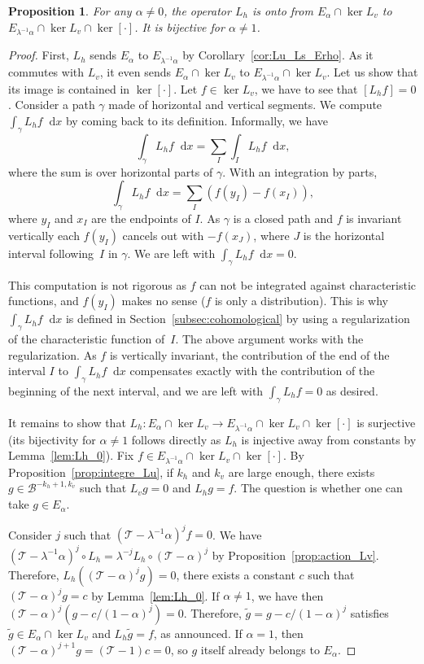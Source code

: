 \documentclass[JEP,XML,SOM,Unicode]{cedram}
\newcommand{\boB}{\mathcal{B}}
\newcommand{\boT}{\mathcal{T}}
\newcommand{\dd}{\mathop{}\!\mathrm{d}}
\newtheorem{prop}[thm]{Proposition}
\theoremstyle{definition}
\numberwithin{equation}{section}
\begin{document}
\begin{prop}
\label{prop:L_h_surj} For any $\alpha \neq 0$, the operator $L_h$ is onto
from $E_\alpha \cap \ker L_v$ to $E_{\lambda^{-1}\alpha} \cap \ker L_v \cap
\ker [\cdot]$. It is bijective for $\alpha \neq 1$.
\end{prop}
\begin{proof}
First, $L_h$ sends $E_\alpha$ to $E_{\lambda^{-1}\alpha}$ by
Corollary~\ref{cor:Lu_Ls_Erho}. As it commutes with $L_v$, it even sends
$E_\alpha \cap \ker L_v$ to $E_{\lambda^{-1}\alpha} \cap \ker L_v$. Let us
show that its image is contained in $\ker [\cdot]$. Let $f \in \ker L_v$, we
have to see that $[L_h f] = 0$. Consider a path $\gamma$ made of horizontal
and vertical segments. We compute $\int_\gamma L_h f \dd x$ by coming back to
its definition. Informally, we have
\[
\int_\gamma L_h f \dd x = \sum_I \int_I
L_h f \dd x,
\]
where the sum is over horizontal parts of $\gamma$. With an
integration by parts,
\[
\int_\gamma L_h f \dd x = \sum_I (f(y_I) - f(x_I)),
\]
where $y_I$ and $x_I$ are the endpoints of $I$. As $\gamma$ is a closed path
and $f$ is invariant vertically each $f(y_I)$ cancels out with $-f(x_J)$, where $J$ is the horizontal interval following~$I$ in $\gamma$. We are left
with $\int_\gamma L_h f \dd x = 0$.

This computation is not rigorous as $f$ can not be integrated against
characteristic functions, and $f(y_I)$ makes no sense ($f$ is only a
distribution). This is why $\int_\gamma L_h f \dd x$ is defined in
Section~\ref{subsec:cohomological} by using a regularization of the
characteristic function of~$I$. The above argument works with the
regularization. As $f$ is vertically invariant, the contribution of the end
of the interval $I$ to $\int_\gamma L_h f \dd x$ compensates exactly with the
contribution of the beginning of the next interval, and we are left with
$\int_\gamma L_h f = 0$ as desired.

It remains to show that $L_h : E_\alpha \cap \ker L_v \to
E_{\lambda^{-1}\alpha} \cap \ker L_v \cap \ker [\cdot]$ is surjective (its
bijectivity for $\alpha \neq 1$ follows directly as $L_h$ is injective away
from constants by Lemma~\ref{lem:Lh_0}). Fix $f \in E_{\lambda^{-1}\alpha}
\cap \ker L_v \cap \ker [\cdot]$. By Proposition~\ref{prop:integre_Lu}, if
$k_h$ and $k_v$ are large enough, there exists $g \in \boB^{-k_h+1, k_v}$
such that $L_v g = 0$ and $L_h g = f$. The question is whether one can take
$g \in E_\alpha$.

Consider $j$ such that $(\boT-\lambda^{-1}\alpha)^j f = 0$. We have
$(\boT-\lambda^{-1}\alpha)^j \circ L_h = \lambda^{-j} L_h \circ
(\boT-\alpha)^j$ by Proposition~\ref{prop:action_Lv}. Therefore, $L_h(
(\boT-\alpha)^j g) = 0$, \ie there exists a constant $c$ such that
$(\boT-\alpha)^j g = c$ by Lemma~\ref{lem:Lh_0}. If $\alpha \neq 1$, we have
then $(\boT-\alpha)^j (g - c/(1-\alpha)^j) = 0$. Therefore, $\tilde g = g -
c/(1-\alpha)^j$ satisfies $\tilde g \in E_\alpha \cap \ker L_v$ and $L_h
\tilde g = f$, as announced. If $\alpha = 1$, then $(\boT-\alpha)^{j+1} g =
(\boT - 1) c = 0$, so $g$ itself already belongs to $E_\alpha$.
\end{proof}
\end{document}
